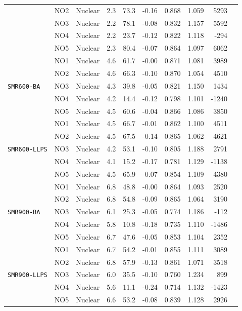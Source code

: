 \begin{table}[htbp]
\begin{tabular}{lllrrrrrrr}
 & NO2 & Nuclear & 2.3 & 73.3 & -0.16 & 0.868 & 1.059 & 5293 \\
 & NO3 & Nuclear & 2.2 & 78.1 & -0.08 & 0.832 & 1.157 & 5592 \\
 & NO4 & Nuclear & 2.2 & 23.7 & -0.12 & 0.822 & 1.118 & -294 \\
 & NO5 & Nuclear & 2.3 & 80.4 & -0.07 & 0.864 & 1.097 & 6062 \\
\midrule
\multirow{5}{*}{\texttt{SMR600-BA}} & NO1 & Nuclear & 4.6 & 61.7 & -0.00 & 0.871 & 1.081 & 3989 \\
 & NO2 & Nuclear & 4.6 & 66.3 & -0.10 & 0.870 & 1.054 & 4510 \\
 & NO3 & Nuclear & 4.3 & 39.8 & -0.05 & 0.821 & 1.150 & 1434 \\
 & NO4 & Nuclear & 4.2 & 14.4 & -0.12 & 0.798 & 1.101 & -1240 \\
 & NO5 & Nuclear & 4.5 & 60.6 & -0.04 & 0.866 & 1.086 & 3850 \\
\midrule
\multirow{5}{*}{\texttt{SMR600-LLPS}} & NO1 & Nuclear & 4.5 & 66.7 & -0.01 & 0.862 & 1.100 & 4511 \\
 & NO2 & Nuclear & 4.5 & 67.5 & -0.14 & 0.865 & 1.062 & 4621 \\
 & NO3 & Nuclear & 4.2 & 53.1 & -0.10 & 0.805 & 1.188 & 2791 \\
 & NO4 & Nuclear & 4.1 & 15.2 & -0.17 & 0.781 & 1.129 & -1138 \\
 & NO5 & Nuclear & 4.5 & 65.9 & -0.07 & 0.854 & 1.109 & 4380 \\
\midrule
\multirow{5}{*}{\texttt{SMR900-BA}} & NO1 & Nuclear & 6.8 & 48.8 & -0.00 & 0.864 & 1.093 & 2520 \\
 & NO2 & Nuclear & 6.8 & 54.8 & -0.09 & 0.865 & 1.064 & 3190 \\
 & NO3 & Nuclear & 6.1 & 25.3 & -0.05 & 0.774 & 1.186 & -112 \\
 & NO4 & Nuclear & 5.8 & 10.8 & -0.18 & 0.735 & 1.110 & -1486 \\
 & NO5 & Nuclear & 6.7 & 47.6 & -0.05 & 0.853 & 1.104 & 2352 \\
\midrule
\multirow{5}{*}{\texttt{SMR900-LLPS}} & NO1 & Nuclear & 6.7 & 54.2 & -0.01 & 0.855 & 1.111 & 3089 \\
 & NO2 & Nuclear & 6.8 & 57.9 & -0.13 & 0.861 & 1.071 & 3518 \\
 & NO3 & Nuclear & 6.0 & 35.5 & -0.10 & 0.760 & 1.234 & 899 \\
 & NO4 & Nuclear & 5.6 & 11.1 & -0.24 & 0.714 & 1.132 & -1423 \\
 & NO5 & Nuclear & 6.6 & 53.2 & -0.08 & 0.839 & 1.128 & 2926 \\

\end{tabular}
\end{table}
